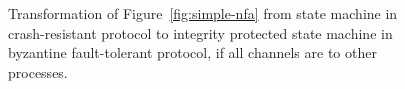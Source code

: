 \documentclass{article}
\begin{document}
	\FloatBarrier
	\begin{figure}[ht!]
		\center
		\caption{Transformation of Figure~\ref{fig:simple-nfa} from state machine in crash-resistant protocol to integrity protected state machine in byzantine fault-tolerant protocol, if all channels are to other processes.\label{fig:nfa-transformation}}
	\end{figure}
	\FloatBarrier
\end{document}
